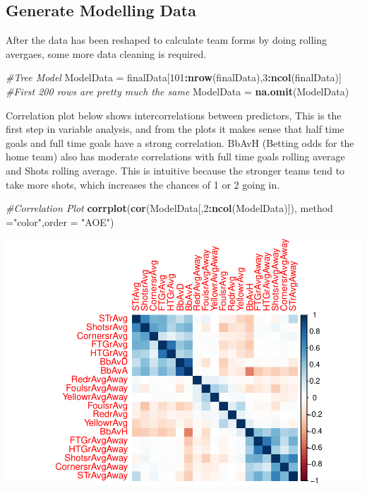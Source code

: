 \documentclass[
]{article}
\newenvironment{Shaded}{\begin{snugshade}}{\end{snugshade}}
\newcommand{\CommentTok}[1]{\textcolor[rgb]{0.56,0.35,0.01}{\textit{#1}}}
\newcommand{\DataTypeTok}[1]{\textcolor[rgb]{0.13,0.29,0.53}{#1}}
\newcommand{\DecValTok}[1]{\textcolor[rgb]{0.00,0.00,0.81}{#1}}
\newcommand{\KeywordTok}[1]{\textcolor[rgb]{0.13,0.29,0.53}{\textbf{#1}}}
\newcommand{\NormalTok}[1]{#1}
\newcommand{\OperatorTok}[1]{\textcolor[rgb]{0.81,0.36,0.00}{\textbf{#1}}}
\newcommand{\StringTok}[1]{\textcolor[rgb]{0.31,0.60,0.02}{#1}}
\begin{document}
\hypertarget{generate-modelling-data}{%
\subsection{Generate Modelling Data}\label{generate-modelling-data}}

After the data has been reshaped to calculate team forms by doing
rolling avergaes, some more data cleaning is required.

\begin{Shaded}
\begin{Highlighting}[]
\CommentTok{#Tree Model}
\NormalTok{ModelData =}\StringTok{ }\NormalTok{finalData[}\DecValTok{101}\OperatorTok{:}\KeywordTok{nrow}\NormalTok{(finalData),}\DecValTok{3}\OperatorTok{:}\KeywordTok{ncol}\NormalTok{(finalData)] }\CommentTok{#First 200 rows are pretty much the same}
\NormalTok{ModelData =}\StringTok{ }\KeywordTok{na.omit}\NormalTok{(ModelData)}
\end{Highlighting}
\end{Shaded}

Correlation plot below shows intercorrelations between predictors, This
is the first step in variable analysis, and from the plots it makes
sense that half time goals and full time goals have a strong
correlation. BbAvH (Betting odds for the home team) also has moderate
correlations with full time goals rolling average and Shots rolling
average. This is intuitive because the stronger teams tend to take more
shots, which increases the chances of 1 or 2 going in.

\begin{Shaded}
\begin{Highlighting}[]
\CommentTok{#Correlation Plot}
\KeywordTok{corrplot}\NormalTok{(}\KeywordTok{cor}\NormalTok{(ModelData[,}\DecValTok{2}\OperatorTok{:}\KeywordTok{ncol}\NormalTok{(ModelData)]), }\DataTypeTok{method =}\StringTok{"color"}\NormalTok{,}\DataTypeTok{order =} \StringTok{"AOE"}\NormalTok{)}
\end{Highlighting}
\end{Shaded}

\begin{center}\includegraphics{EPL_Model_files/figure-latex/unnamed-chunk-5-1} \end{center}
\end{document}
